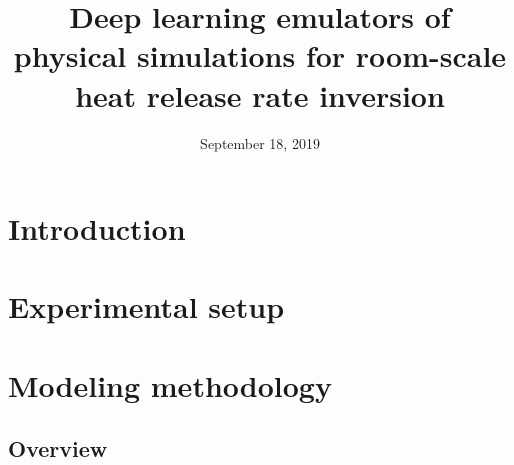\documentclass{article}
\begin{document}
\title{Deep learning emulators of physical simulations for room-scale heat release rate inversion}
\author{}
\date{September 18, 2019}

\maketitle

\begin{abstract}

\end{abstract}




\section{Introduction}
\section{Experimental setup}





\section{Modeling methodology}
\subsection{Overview}
\end{document}
